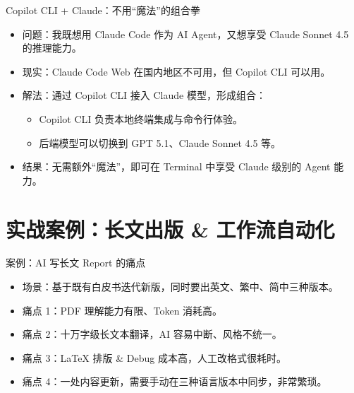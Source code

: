 \documentclass[10pt,aspectratio=169]{beamer}
\begin{document}
\begin{frame}{Copilot CLI + Claude：不用“魔法”的组合拳}
  \begin{itemize}
    \item 问题：我既想用 Claude Code 作为 AI Agent，又想享受 Claude Sonnet 4.5 的推理能力。
    \item 现实：Claude Code Web 在国内地区不可用，但 Copilot CLI 可以用。
    \item 解法：通过 Copilot CLI 接入 Claude 模型，形成组合：
      \begin{itemize}
        \item Copilot CLI 负责本地终端集成与命令行体验。
        \item 后端模型可以切换到 GPT 5.1、Claude Sonnet 4.5 等。
      \end{itemize}
    \item 结果：无需额外“魔法”，即可在 Terminal 中享受 Claude 级别的 Agent 能力。
  \end{itemize}
\end{frame}

\section{实战案例：长文出版 \& 工作流自动化}

\begin{frame}{案例：AI 写长文 Report 的痛点}
  \begin{itemize}
    \item 场景：基于既有白皮书迭代新版，同时要出英文、繁中、简中三种版本。
    \item 痛点 1：PDF 理解能力有限、Token 消耗高。
    \item 痛点 2：十万字级长文本翻译，AI 容易中断、风格不统一。
    \item 痛点 3：LaTeX 排版 \& Debug 成本高，人工改格式很耗时。
    \item 痛点 4：一处内容更新，需要手动在三种语言版本中同步，非常繁琐。
  \end{itemize}
\end{frame}
\end{document}
